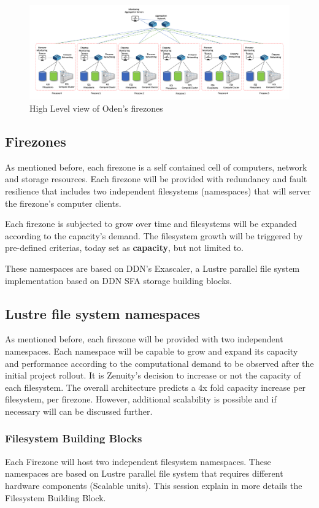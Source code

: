 \documentclass{article}
\begin{document}
\begin{figure}[h]
    \centering
    \includegraphics[scale=0.26]{Firezones-high-level.png}
    \caption{High Level view of Oden's firezones}
    \label{fig:firezones-general-view}
\end{figure}

\subsection{Firezones}
As mentioned before, each firezone is a self contained cell of computers, network and storage resources. Each firezone will be provided with redundancy and fault resilience that includes two independent filesystems (namespaces) that will server the firezone's computer clients. 

Each firezone is subjected to grow over time and filesystems will be expanded according to the capacity's demand. The filesystem growth will be triggered by pre-defined criterias, today set as \textbf{capacity}, but not limited to. 

These namespaces are based on DDN's Exascaler, a Lustre parallel file system implementation based on DDN SFA storage building blocks.

\subsection{Lustre file system namespaces}
As mentioned before, each firezone will be provided with two independent namespaces. Each namespace will be capable to grow and expand its capacity and performance according to the computational demand to be observed after the initial project rollout. It is Zenuity's decision to increase or not the capacity of each filesystem. The overall architecture predicts a 4x fold capacity increase per filesystem, per firezone. However, additional scalability is possible and if necessary will can be discussed further.

\subsubsection{Filesystem Building Blocks}
Each Firezone will host two independent filesystem namespaces. These namespaces are based on Lustre parallel file system that requires different hardware components (Scalable units). This session explain in more details the Filesystem Building Block. 
\end{document}
